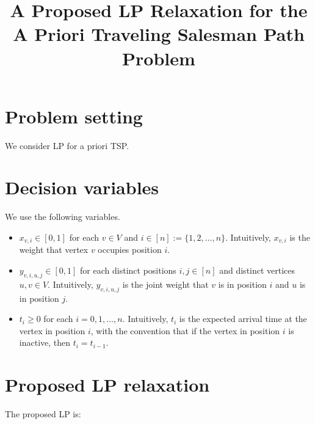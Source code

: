 \documentclass[11pt]{article}
\title{A Proposed LP Relaxation for the A Priori Traveling Salesman Path Problem}
\author{}
\date{}
\begin{document}
\maketitle

\section*{Problem setting}
We consider LP for a priori TSP.

\section*{Decision variables}
We use the following variables.

\begin{itemize}[leftmargin=1.5em]
    \item $x_{v,i} \in [0,1]$ for each $v \in V$ and $i \in [n] := \{1,2,\dots,n\}$. Intuitively, $x_{v,i}$ is the weight that vertex $v$ occupies position $i$.
    \item $y_{v,i,u,j} \in [0,1]$ for each distinct positions $i,j \in [n]$ and distinct vertices $u,v \in V$. Intuitively, $y_{v,i,u,j}$ is the joint weight that $v$ is in position $i$ and $u$ is in position $j$.
    \item $t_i \ge 0$ for each $i=0,1,\dots,n$. Intuitively, $t_i$ is the expected arrival time at the vertex in position $i$, with the convention that if the vertex in position $i$ is inactive, then $t_i=t_{i-1}$.
\end{itemize}

\section*{Proposed LP relaxation}
The proposed LP is:
\end{document}
